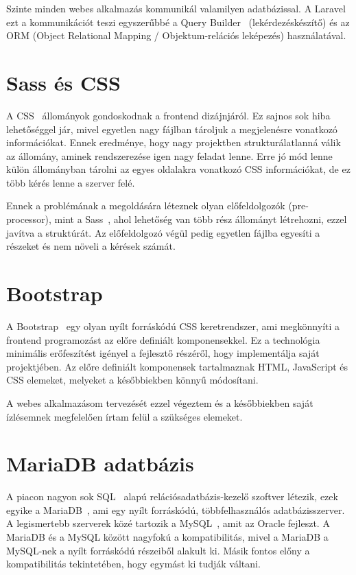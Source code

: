 \documentclass[
]{thesis-ekf}
\theoremstyle{definition}
\theoremstyle{remark}
\begin{document}
	Szinte minden webes alkalmazás kommunikál valamilyen adatbázissal. A Laravel ezt a kommunikációt teszi egyszerűbbé a Query Builder~\cite{laravel_querybuilder} (lekérdezéskészítő) és az ORM (Object Relational Mapping / Objektum-relációs leképezés) használatával. 
	
	\section{Sass és CSS}
	A CSS~\cite{css_doc} állományok gondoskodnak a frontend dizájnjáról. Ez sajnos sok hiba lehetőséggel jár, mivel egyetlen nagy fájlban tároljuk a megjelenésre vonatkozó információkat. Ennek eredménye, hogy nagy projektben strukturálatlanná válik az állomány, aminek rendszerezése igen nagy feladat lenne. Erre jó mód lenne külön állományban tárolni az egyes oldalakra vonatkozó CSS információkat, de ez több kérés lenne a szerver felé. 
	
	Ennek a problémának a megoldására léteznek olyan előfeldolgozók (pre-processor), mint a Sass~\cite{sass_doc}, ahol lehetőség van több rész állományt létrehozni, ezzel javítva a struktúrát. Az előfeldolgozó végül pedig egyetlen fájlba egyesíti a részeket és nem növeli a kérések számát. 
	
	\section{Bootstrap}
	A Bootstrap~\cite{bootstrap_doc} egy olyan nyílt forráskódú CSS keretrendszer, ami megkönnyíti a frontend programozást az előre definiált komponensekkel. Ez a technológia minimális erőfeszítést igényel a fejlesztő részéről, hogy implementálja saját projektjében. Az előre definiált komponensek tartalmaznak HTML, JavaScript és CSS elemeket, melyeket a későbbiekben könnyű módosítani.
	
	A webes alkalmazásom tervezését ezzel végeztem és a későbbiekben saját ízlésemnek megfelelően írtam felül a szükséges elemeket. 
	
	\section{MariaDB adatbázis}
	A piacon nagyon sok SQL~\cite{sql_book} alapú relációsadatbázis-kezelő szoftver létezik, ezek egyike a MariaDB~\cite{mariadb_doc}, ami egy nyílt forráskódú, többfelhasználós adatbázisszerver. A legismertebb szerverek közé tartozik a MySQL~\cite{mysql_book}, amit az Oracle fejleszt. A MariaDB és a MySQL között nagyfokú a kompatibilitás, mivel a MariaDB a MySQL-nek a nyílt forráskódú részeiből alakult ki. Másik fontos előny a kompatibilitás tekintetében, hogy egymást ki tudják váltani.
	
\end{document}
